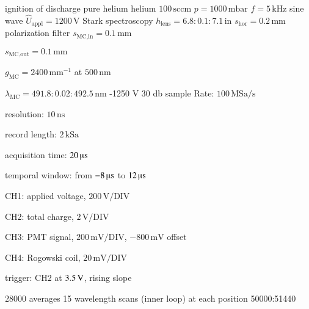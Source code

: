 \begin{Liste}
	\itemwas ignition of discharge
	 pure helium
	 helium $100\,\text{sccm}$
	 $p=1000\,\text{mbar}$
	 $f=5\,\text{kHz}$
	 sine wave
	 $\hat U_\text{appl}=1200\,\text{V}$
	\leer
	\itemwas Stark spectroscopy
	 $h_\text{lens}=6.8:0.1:7.1\,\text{in}$
	 $s_\text{hor}=0.2\,\text{mm}$
	 polarization filter
 	 $s_\text{MC,in}=0.1\,\text{mm}$
	\item $s_\text{MC,out}=0.1\,\text{mm}$
	\item $g_\text{MC}=2400\,\text{mm}^{-1}$ at $500\,\text{nm}$
	\item $\lambda_\text{MC}=491.8:0.02:492.5\,\text{nm}$
	 -1250 V
	 30 db
	\leer
	 sample Rate: $100\,\text{MSa}/\text{s}$
	\item resolution: $10\,\text{ns}$
	\item record length: $2\,\text{kSa}$
	\item acquisition time: $20\,\text{\textmu s}$
	\item temporal window: from $-8\,\text{\textmu s}$ to $12\,\text{\textmu s}$
	\item CH1: applied voltage, $200\,\text{V}/\text{DIV}$
	\item CH2: total charge, $2\,\text{V}/\text{DIV}$
	\item CH3: PMT signal, $200\,\text{mV}/\text{DIV}$, $-800\,\text{mV}$ offset
	\item CH4: Rogowski coil, $20\,\text{mV}/\text{DIV}$
	\item trigger: CH2 at $\-3.5\,\text{V}$, rising slope
	\item $28000$ averages
	 15 wavelength scans (inner loop) at each position
	\leer
	 50000:51440
\end{Liste}